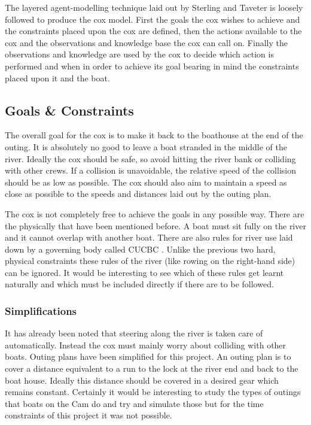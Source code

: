       The layered agent-modelling technique laid out by Sterling and Taveter \cite{Sterling2009} is loosely followed to produce the cox model. First the goals the cox wishes to achieve and the constraints placed upon the cox are defined, then the actions available to the cox and the observations and knowledge base the cox can call on. Finally the observations and knowledge are used by the cox to decide which action is performed and when in order to achieve its goal bearing in mind the constraints placed upon it and the boat.

      \subsection{Goals \& Constraints}
      The overall goal for the cox is to make it back to the boathouse at the end of the outing. It is absolutely no good to leave a boat stranded in the middle of the river. Ideally the cox should be safe, so avoid hitting the river bank or colliding with other crews. If a collision is unavoidable, the relative speed of the collision should be as low as possible. The cox should also aim to maintain a speed as close as possible to the speeds and distances laid out by the outing plan.
      
      The cox is not completely free to achieve the goals in any possible way. There are the physically that have been mentioned before. A boat must sit fully on the river and it cannot overlap with another boat. There are also rules for river use laid down by a governing body called CUCBC \cite{CUCBC}. Unlike the previous two hard, physical constraints these rules of the river (like rowing on the right-hand side) can be ignored. It would be interesting to see which of these rules get learnt naturally and which must be included directly if there are to be followed.
      
      \subsubsection{Simplifications} \label{model:cox:goals:simplifications}
      It has already been noted that steering along the river is taken care of automatically. Instead the cox must mainly worry about colliding with other boats. Outing plans have been simplified for this project. An outing plan is to cover a distance equivalent to a run to the lock at the river end and back to the boat house. Ideally this distance should be covered in a desired gear which remains constant. Certainly it would be interesting to study the types of outings that boats on the Cam do and try and simulate those but for the time constraints of this project it was not possible.
      
